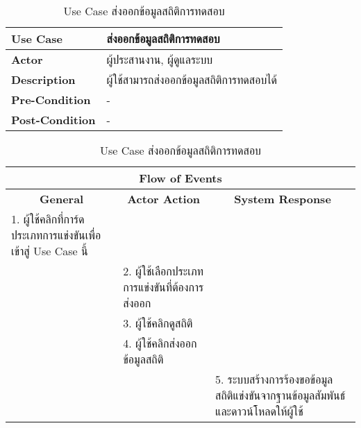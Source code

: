 \begin{table}[H]
    \caption{Use Case ส่งออกข้อมูลสถิติการทดสอบ}
    \label{tab:usecase-export-stats}
    \begin{tabularx}{\textwidth}{ | p{3cm} | X | }
    \hline
    \textbf{Use Case} & ส่งออกข้อมูลสถิติการทดสอบ \\
    \hline
    \textbf{Actor} & ผู้ประสานงาน, ผู้ดูแลระบบ \\
    \hline
    \textbf{Description} & ผู้ใช้สามารถส่งออกข้อมูลสถิติการทดสอบได้ \\
    \hline
    \textbf{Pre-Condition} & - \\
    \hline
    \textbf{Post-Condition} & - \\
    \hline
    \end{tabularx}
    \begin{tabularx}{\textwidth}{ | X | X | X | }
    \multicolumn{3}{|c|}{\textbf{Flow of Events}} \\
    \hline
    \multicolumn{1}{|c|}{\textbf{General}} & \multicolumn{1}{|c|}{\textbf{Actor Action}} & \multicolumn{1}{|c|}{\textbf{System Response}} \\
    \hline
    1. ผู้ใช้คลิกที่การ์ดประเภทการแข่งขันเพื่อเข้าสู่ Use Case นี้ &  &  \\
    \hline
    & 2. ผู้ใช้เลือกประเภทการแข่งขันที่ต้องการส่งออก & \\
    \hline
    & 3. ผู้ใช้คลิกดูสถิติ & \\
    \hline
    & 4. ผู้ใช้คลิกส่งออกข้อมูลสถิติ & \\
    \hline
    & & 5. ระบบสร้างการร้องขอข้อมูลสถิติแข่งขันจากฐานข้อมูลสัมพันธ์และดาวน์โหลดให้ผู้ใช้ \\
    \hline
    \end{tabularx}
\end{table}
